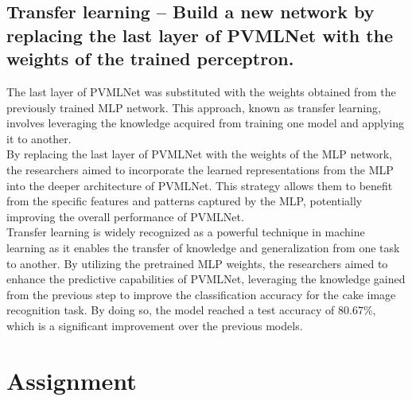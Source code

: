 \documentclass{class}
\begin{document}
\subsection{Transfer learning -- Build a new network by replacing the last layer of PVMLNet with the weights of the
    trained perceptron.}
The last layer of PVMLNet was substituted with the weights obtained from the previously trained MLP network.
This approach, known as transfer learning, involves leveraging the knowledge acquired from training one model and applying it to another.\\
By replacing the last layer of PVMLNet with the weights of the MLP network, the researchers aimed to incorporate the learned representations
from the MLP into the deeper architecture of PVMLNet.
This strategy allows them to benefit from the specific features and patterns captured by the MLP, potentially improving the overall performance of PVMLNet.\\
Transfer learning is widely recognized as a powerful technique in machine learning as it enables the transfer of knowledge and generalization from one task to another.
By utilizing the pretrained MLP weights, the researchers aimed to enhance the predictive capabilities of PVMLNet,
leveraging the knowledge gained from the previous step to improve the classification accuracy for the cake image recognition task.
By doing so, the model reached a test accuracy of 80.67\%, which is a significant improvement over the previous models.

\section{Assignment}
\end{document}
